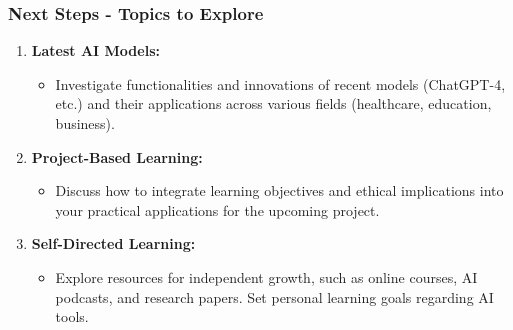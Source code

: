 \documentclass[aspectratio=169]{beamer}
\begin{document}
\begin{frame}[fragile]
    \frametitle{Next Steps - Topics to Explore}
    \begin{enumerate}
        \item \textbf{Latest AI Models:}
            \begin{itemize}
                \item Investigate functionalities and innovations of recent models (ChatGPT-4, etc.) and their applications across various fields (healthcare, education, business).
            \end{itemize}
        
        \item \textbf{Project-Based Learning:}
            \begin{itemize}
                \item Discuss how to integrate learning objectives and ethical implications into your practical applications for the upcoming project.
            \end{itemize}

        \item \textbf{Self-Directed Learning:}
            \begin{itemize}
                \item Explore resources for independent growth, such as online courses, AI podcasts, and research papers. Set personal learning goals regarding AI tools.
            \end{itemize}
    \end{enumerate}
\end{frame}
\end{document}
